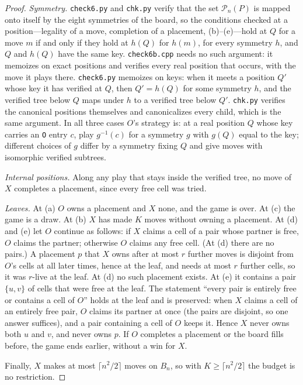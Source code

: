 \documentclass[11pt]{article}
\theoremstyle{definition}
\theoremstyle{remark}
\newcommand{\file}[1]{\texttt{#1}}
\newcommand{\Pl}{\mathcal{P}}
\begin{document}
\begin{proof}
\emph{Symmetry.} \file{check6.py} and \file{chk.py} verify that the set
$\Pl_n(P)$ is mapped onto itself by the eight symmetries of the board, so the conditions checked at
a position---legality of a move, completion of a placement, (b)--(e)---hold at $Q$ for a move $m$ if
and only if they hold at $h(Q)$ for $h(m)$, for every symmetry $h$, and $Q$ and $h(Q)$ have the same
key. \file{check6b.cpp} needs no such argument: it memoizes on exact positions and verifies every real position that occurs,
with the move it plays there. \file{check6.py} memoizes on keys: when it meets a position $Q'$
whose key it has verified at $Q$, then $Q'=h(Q)$ for some symmetry $h$, and the verified tree
below $Q$ maps under $h$ to a verified tree below $Q'$. \file{chk.py} verifies the canonical
positions themselves and canonicalizes every child, which is the same argument. In all three cases
$O$'s strategy is: at a real position $Q$ whose key carries an \texttt{O} entry $c$, play
$g^{-1}(c)$ for a symmetry $g$ with $g(Q)$ equal to the key; different choices of $g$ differ by a
symmetry fixing $Q$ and give moves with isomorphic verified subtrees.

\emph{Internal positions.} Along any play that stays inside the verified tree, no move of $X$
completes a placement, since every free cell was tried.

\emph{Leaves.} At (a) $O$ owns a placement and $X$ none, and the game is over. At (c) the game is
a draw. At (b) $X$ has made $K$ moves without owning a placement. At (d) and (e) let $O$ continue
as follows: if $X$ claims a cell of a pair whose partner is free, $O$ claims the partner; otherwise
$O$ claims any free cell. (At (d) there are no pairs.) A placement $p$ that $X$ owns after at most
$r$ further moves is disjoint from $O$'s cells at all later times, hence at the leaf, and needs at
most $r$ further cells, so it was $r$-live at the leaf. At (d) no such placement exists. At (e)
it contains a pair $\{u,v\}$ of cells that were free at the leaf. The statement ``every pair is
entirely free or contains a cell of $O$'' holds at the leaf and is preserved: when $X$ claims a cell
of an entirely free pair, $O$ claims its partner at once (the pairs are disjoint, so one answer
suffices), and a pair containing a cell of $O$ keeps it. Hence $X$ never owns both $u$ and $v$, and
never owns $p$. If $O$ completes a placement or the board fills before,
the game ends earlier, without a win for $X$.

Finally, $X$ makes at most $\lceil n^2/2\rceil$ moves on $B_n$, so with $K\ge\lceil n^2/2\rceil$
the budget is no restriction.
\end{proof}
\end{document}
